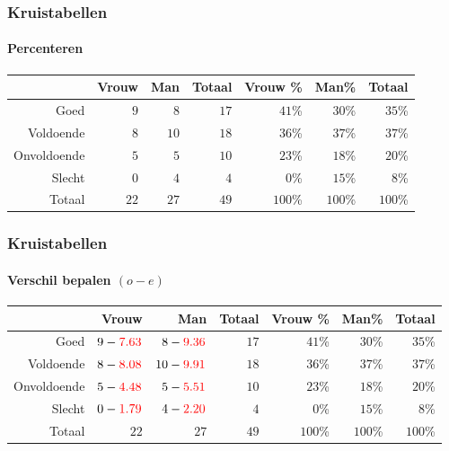 \documentclass[aspectratio=169]{beamer}
\begin{document}
\begin{frame}
  \frametitle{Kruistabellen}
  \framesubtitle{Percenteren}
  
  \begin{adjustwidth}{-1.5em}{-1.5em}
    \begin{table}[h] \centering
      \begin{tabular}{@{}rrrrrrr@{}} \toprule
        & Vrouw & Man & Totaal & Vrouw \% & Man\%   & Totaal  \\ \midrule
        Goed        & $9$     & $8$  & $17$     & $41$\%  & $30$\%  & $35$\% \\
        Voldoende   & $8$     & $10$ & $18$     & $36$\%  & $37$\%  & $37$\% \\
        Onvoldoende & $5$     & $5$  & $10$     & $23$\%  & $18$\%  & $20$\% \\
        Slecht      & $0$     & $4$  & $4$      & $0$\%   & $15$\%  & $8$\%  \\
        Totaal      & $22$    & $27$ & $49$     & $100$\% & $100$\% & $100$\%\\
        \bottomrule
      \end{tabular}
    \end{table}
  \end{adjustwidth}
\end{frame}

\begin{frame}
  \frametitle{Kruistabellen}
  \framesubtitle{Verschil bepalen $(o - e)$}
  
  \begin{adjustwidth}{-1.5em}{-1.5em}
    \begin{table}[h] \centering
      \begin{tabular}{@{}rrrrrrr@{}} \toprule
        & Vrouw & Man & Totaal & Vrouw \% & Man\%   & Totaal  \\ \midrule
        Goed        & $9 -\textcolor{red}{7.63}$     & $8 - \textcolor{red}{9.36}$   & $17$     & $41$\%  & $30$\% & $35$\% \\
        Voldoende   & $8 - \textcolor{red}{8.08}$   & $10 - \textcolor{red}{9.91}$  & $18$     & $36$\%  & $37$\%    & $37$\% \\
        Onvoldoende & $5 - \textcolor{red}{4.48}$    & $5 - \textcolor{red}{5.51}$  & $10$     & $23$\%  & $18$\% & $20$\% \\
        Slecht      & $0 - \textcolor{red}{1.79}$    & $4 - \textcolor{red}{2.20}$  & $4$      & $0$\%      & $15$\% & $8$\%  \\
        Totaal      & $22$    & $27$  & $49$     & $100$\%    & $100$\%   & $100$\%   \\
        \bottomrule
      \end{tabular}
    \end{table}
  \end{adjustwidth}
\end{frame}
\end{document}
